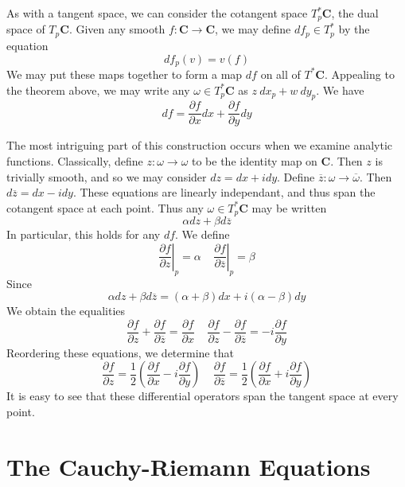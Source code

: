 As with a tangent space, we can consider the cotangent space $T_p^* \mathbf{C}$, the dual space of $T_p \mathbf{C}$. Given any smooth $f: \mathbf{C} \to \mathbf{C}$, we may define $df_p \in T_p^*$ by the equation
%
\[ df_p (v) = v(f) \]
%
We may put these maps together to form a map $df$ on all of $T^* \mathbf{C}$. Appealing to the theorem above, we may write any $\omega \in T_p^* \mathbf{C}$ as $z\ dx_p + w\ dy_p$. 
%
We have
%
\[ df = \frac{\partial f}{\partial x} dx + \frac{\partial f}{\partial y} dy \]

The most intriguing part of this construction occurs when we examine analytic functions. Classically, define $z: \omega \to \omega$ to be the identity map on $\mathbf{C}$. Then $z$ is trivially smooth, and so we may consider $dz = dx + i dy$. Define $\overline{z} : \omega \to \overline{\omega}$. Then $d\overline{z} = dx - i dy$. These equations are linearly independant, and thus span the cotangent space at each point. Thus any $\omega \in T_p^* \mathbf{C}$ may be written
%
\[ \alpha dz + \beta d\overline{z} \]
%
In particular, this holds for any $df$. We define
%
\[ \left.\frac{\partial f}{\partial z}\right|_p = \alpha\ \ \ \ \ \left.\frac{\partial f}{\partial \overline{z}}\right|_p = \beta \]
%
Since
%
\[ \alpha dz + \beta d\overline{z} = (\alpha + \beta) dx + i(\alpha - \beta) dy \]
%
We obtain the equalities
%
\[ \frac{\partial f}{\partial z} + \frac{\partial f}{\partial \overline{z}} = \frac{\partial f}{\partial x}\ \ \ \ \ \frac{\partial f}{\partial z} - \frac{\partial f}{\partial \overline{z}} = -i \frac{\partial f}{\partial y} \]
%
Reordering these equations, we determine that
%
\[ \frac{\partial f}{\partial z} = \frac{1}{2} \left( \frac{\partial f}{\partial x} - i \frac{\partial f}{\partial y} \right)\ \ \ \ \ \frac{\partial f}{\partial \overline{z}} = \frac{1}{2} \left( \frac{\partial f}{\partial x} + i \frac{\partial f}{\partial y} \right) \]
%
It is easy to see that these differential operators span the tangent space at every point.



\section{The Cauchy-Riemann Equations}

